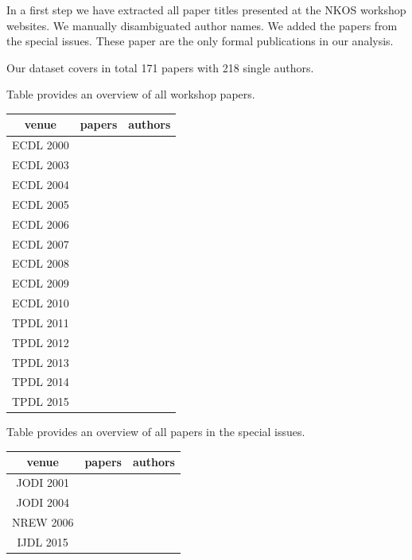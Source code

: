 \documentclass[runningheads,a4paper]{llncs}
\begin{document}
In a first step we have extracted all paper titles presented at the NKOS workshop websites. We manually disambiguated author names. We added the papers from the special issues. These paper are the only formal publications in our analysis.

Our dataset covers in total 171 papers with 218 single authors.

Table provides an overview of all workshop papers.


\begin{tabular}	{|c|c|c|}
	\hline 
	venue& papers  & authors  \\ 
	\hline 
	ECDL 2000&  &  \\ 
	\hline 
	ECDL 2003&  &  \\ 
	\hline 
	ECDL 2004&  &  \\ 
	\hline 
	ECDL 2005&  &  \\ 
	\hline 
	ECDL 2006&  &  \\ 
	\hline 
	ECDL 2007&  &  \\ 
	\hline 
	ECDL 2008&  &  \\ 
	\hline 
	ECDL 2009&  &  \\ 
	\hline 
	ECDL 2010&  &  \\ 
	\hline 
	TPDL 2011&  &  \\ 
	\hline 
	TPDL 2012&  &  \\ 
	\hline 
	TPDL 2013&  &  \\ 
	\hline 
	TPDL 2014&  &  \\ 
	\hline 
	TPDL 2015&  &  \\ 
	\hline 
\end{tabular} 


Table provides an overview of all papers in the special issues.

\begin{tabular}{|c|c|c|}
	\hline 
	venue& papers  & authors  \\ 
	\hline 
	JODI 2001&  &  \\ 
	\hline 
	JODI 2004&  &  \\ 
	\hline 
	NREW 2006&  &  \\ 
	\hline 
	IJDL 2015&  &  \\ 
	\hline 
\end{tabular} 


\end{document}
